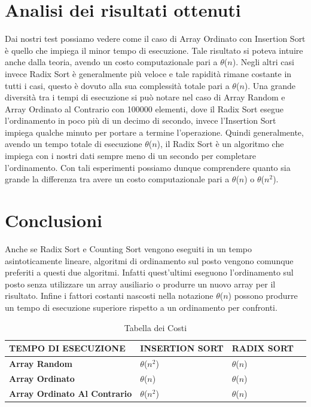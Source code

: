 \documentclass[a4paper]{article}
\begin{document}
\clearpage

\section{Analisi dei risultati ottenuti}

Dai nostri test possiamo vedere come il caso di Array Ordinato con Insertion Sort è quello che impiega il minor tempo di esecuzione.
Tale risultato si poteva intuire anche dalla teoria, avendo un costo computazionale pari a $\theta$($n$).
\newline
Negli altri casi invece Radix Sort è generalmente più veloce e tale rapidità rimane costante in tutti i casi, questo è dovuto alla
sua complessità totale pari a $\theta$($n$).
\newline
Una grande diversità tra i tempi di esecuzione si può notare nel caso di Array Random e Array Ordinato al Contrario con 100000 elementi, dove il Radix Sort esegue l'ordinamento in poco più di un decimo di secondo, invece l'Insertion Sort impiega qualche minuto per portare a termine l'operazione.
\newline
Quindi generalmente, avendo un tempo totale di esecuzione $\theta$($n$), il Radix Sort è un algoritmo che impiega con i nostri dati sempre meno di un secondo per completare l'ordinamento.
\newline
Con tali esperimenti possiamo dunque comprendere quanto sia grande la differenza tra avere un costo computazionale
pari a $\theta$($n$) o $\theta$($n^2$).
\newline

\section{Conclusioni}
Anche se Radix Sort e Counting Sort vengono eseguiti in un tempo asintoticamente lineare, algoritmi di ordinamento sul posto vengono comunque preferiti a questi due algoritmi.
\newline
Infatti quest'ultimi eseguono l'ordinamento sul posto senza utilizzare un array ausiliario o produrre un nuovo array per il risultato. Infine i fattori costanti nascosti nella notazione $\theta$($n$) possono produrre un tempo di esecuzione superiore rispetto a un ordinamento per confronti.

\begin{center}
\begin{table}[h!]
\centering
\begin{tabular}{|l|l|l|l}
\hline
\textbf{TEMPO DI ESECUZIONE} & \textbf{INSERTION SORT} & \textbf{RADIX SORT}\\
\hline
\textbf{Array Random} & $\theta$($n^2$) & $\theta$($n$)\\
\hline
\textbf{Array Ordinato} & $\theta$($n$) & $\theta$($n$)\\
\hline
\textbf{Array Ordinato Al Contrario} & $\theta$($n^2$) & $\theta$($n$) \\
\hline
\end{tabular}
\caption{Tabella dei Costi}
\end{table}
\end{center}
\end{document}
